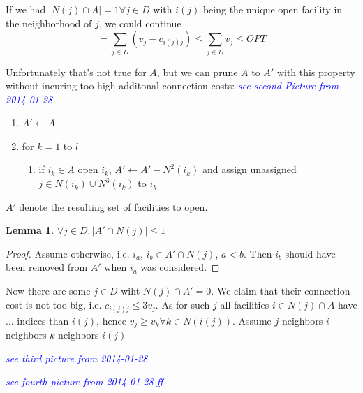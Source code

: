 \documentclass{article}
\newtheorem{lemma}{Lemma}
\begin{document}
If we had $|N(j) \cap A| = 1 \forall j \in D$ with $i(j)$ being the unique open facility in the neighborhood of $j$, we could continue 
\[
	= \sum_{j \in D}{(v_j - c_{i(j)j}) \leq \sum_{j \in D}{v_j} \leq OPT}
\]

Unfortunately that's not true for $A$, but we can prune $A$ to $A'$ with this property without incuring too high additonal connection costs: \textcolor{blue}{\emph{see second Picture from 2014-01-28}}

\begin{enumerate}
	\item $A' \leftarrow A$
	\item for $k = 1$ to $l$
		\begin{enumerate}
			\item if $i_k \in A$ open $i_k$, $A' \leftarrow A' - N^2(i_k)$ and assign unassigned $j \in N(i_k) \cup N^3(i_k)$ to $i_k$ 
		\end{enumerate}
\end{enumerate}

$A'$ denote the resulting set of facilities to open.

\begin{lemma}
	$\forall j \in D: |A' \cap N(j)| \leq 1$
\end{lemma}

\begin{proof}
Assume otherwise, i.e. $i_a$, $i_b \in A' \cap N(j)$, $ a < b$. Then $i_b$ should have been removed from $A'$ when $i_a$ was considered. 
\end{proof}

Now there are some $j \in D$ wiht $N(j) \cap A' = 0$. We claim that their connection cost is not too big, i.e. $c_{i(j)j} \leq 3 v_j$.
As for such $j$ all facilities $i \in N(j) \cap A$ have ... indices than $i(j)$, hence $v_j \geq v_k \forall k \in N(i(j))$. Assume $j$ neighbors $i$ neighbors $k$ neighbors $i(j)$

\textcolor{blue}{\emph{see third picture from 2014-01-28}}

\textcolor{blue}{\emph{see fourth picture from 2014-01-28 ff}}
\end{document}
